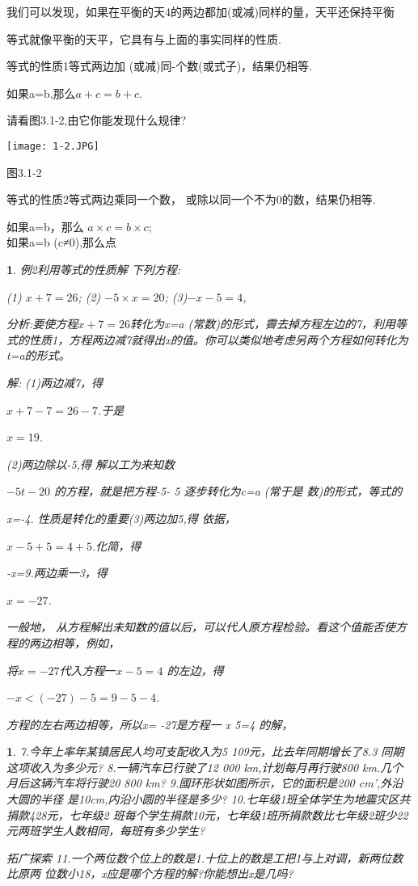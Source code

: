 \documentclass[11pt]{article}
\newtheorem{exercise}{ }
\newtheorem{example}{ }
\begin{document}
我们可以发现，如果在平衡的天4的两边都加(或减)同样的量，天平还保持平衡

等式就像平衡的天平，它具有与上面的事实同样的性质.

等式的性质1等式两边加 (或减)同-个数(或式子)，结果仍相等.

如果a=b,那么$a+c=b+c$.

请看图3.1-2,由它你能发现什么规律?
\begin{center}
  \texttt{[image: 1-2.JPG]}\\
\end{center}
图3.1-2

等式的性质2等式两边乘同一个数， 或除以同一个不为0的数，结果仍相等.

如果a=b，那么 $a \times c=b \times c$;\\

如果a=b (c≠0),那么点

\begin{example}

例2利用等式的性质解 下列方程:

(1) $x+7=26$;  (2) $-5 \times x=20$;  (3)$-x-5=4$,

分析:要使方程$x+7=26$转化为x=a (常数)的形式，霽去掉方程左边的7，利用等式的性质1，方程两边减7就得出x的值。你可以类似地考虑另两个方程如何转化为t=a的形式。

解: (1)两边减7，得

$x+7-7=26-7$.于是

$x=19$.

(2)两边除以-5,得  解以工为来知数

$-5t-20$  的方程，就是把方程-5- 5  逐步转化为c=a (常于是  数)的形式，等式的

x=-4.  性质是转化的重要(3)两边加5,得  依据，

$x-5+5=4+5$.化简，得

-x=9.两边乘一3，得

$x=-27$.

一般地， 从方程解出未知数的值以后，可以代人原方程检验。看这个值能否使方程的两边相等，例如，

将$x=-27$代入方程$一x-5=4$ 的左边，得

$-x<(-27)-5=9-5-4$.

方程的左右两边相等，所以x= -27是方程一 x 5=4 的解，
\end{example}

\begin{exercise}
7.今年上率年某镇居民人均可支配收入为5 109元，比去年同期增长了8.3%
同期这项收入为多少元?
8.一辆汽车已行驶了12 000 km,计划每月再行驶800 km.几个
月后这辆汽车将行驶20 800 km?
9.國环形状如图所示，它的面积是200 cm',外沿大圆的半径
是10cm,内沿小圆的半径是多少?
10.七年级1班全体学生为地震灾区共捐款428元，七年级2
班每个学生捐款10元，七年级1班所捐款数比七年级2班少22元两班学生人数相同，每班有多少学生?

拓广探索
11.一个两位数个位上的数是1.十位上的数是工把1与上对调，新两位数比原两
位数小18，x应是哪个方程的解?你能想出x是几吗?
\end{exercise}
\end{document}
